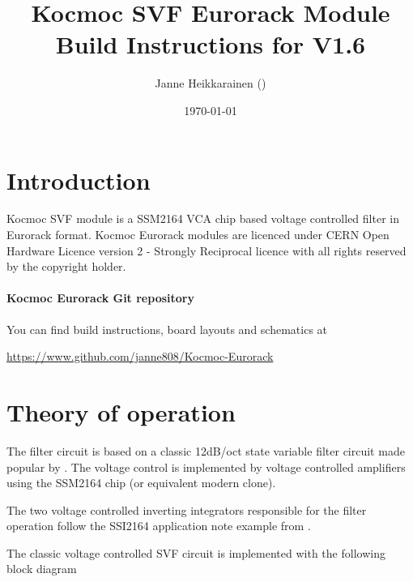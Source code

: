 \documentclass{article}
\title{Kocmoc SVF Eurorack Module Build Instructions for V1.6}
\author{Janne Heikkarainen (\email{janne808@radiofreerobotron.net}) \\
	}
\date{\today}
\begin{document}
\maketitle

\section{Introduction}
Kocmoc SVF module is a SSM2164 VCA chip based voltage controlled filter in Eurorack format. Kocmoc Eurorack modules are licenced under CERN Open Hardware Licence version 2 - Strongly Reciprocal licence with all rights reserved by the copyright holder. \newline

\paragraph{Kocmoc Eurorack Git repository}
\begin{flushleft}
You can find build instructions, board layouts and schematics at \newline
\end{flushleft}
\begin{center}
\href{https://www.github.com/janne808/Kocmoc-Eurorack}{https://www.github.com/janne808/Kocmoc-Eurorack}
\end{center}

\section{Theory of operation} \label{theoryofoperation}

The filter circuit is based on a classic 12dB/oct state variable filter circuit made popular by \cite{chamberlin}. The voltage control is implemented by voltage controlled amplifiers using the SSM2164 chip (or equivalent modern clone).\newline


The two voltage controlled inverting integrators responsible for the filter operation follow the SSI2164 application note example from \cite{allaert}.\newline


The classic voltage controlled SVF circuit is implemented with the following block diagram
\end{document}
